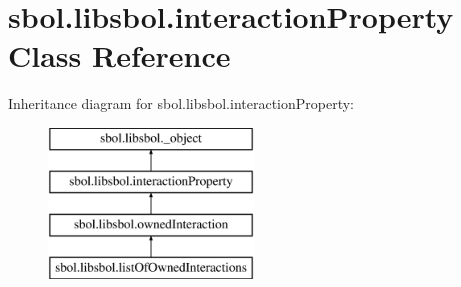 \hypertarget{classsbol_1_1libsbol_1_1interaction_property}{}\section{sbol.\+libsbol.\+interaction\+Property Class Reference}
\label{classsbol_1_1libsbol_1_1interaction_property}
Inheritance diagram for sbol.\+libsbol.\+interaction\+Property\+:\begin{figure}[H]
\begin{center}
\leavevmode
\includegraphics[height=4.000000cm]{classsbol_1_1libsbol_1_1interaction_property}
\end{center}
\end{figure}
